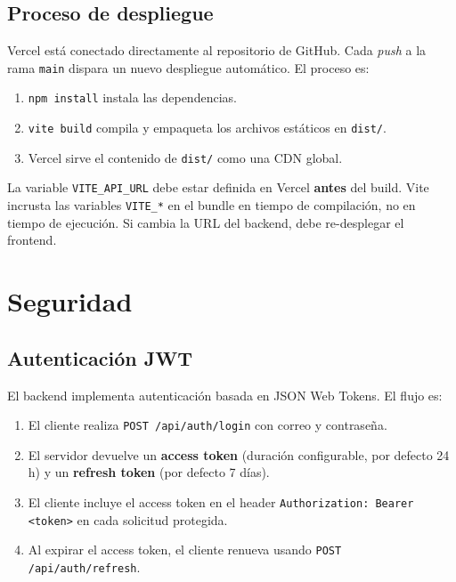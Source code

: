 \documentclass[11pt, a4paper]{article}
\begin{document}
\subsection{Proceso de despliegue}

Vercel está conectado directamente al repositorio de GitHub. Cada \textit{push} a la rama \texttt{main} dispara un nuevo despliegue automático. El proceso es:

\begin{enumerate}
  \item \texttt{npm install} instala las dependencias.
  \item \texttt{vite build} compila y empaqueta los archivos estáticos en \texttt{dist/}.
  \item Vercel sirve el contenido de \texttt{dist/} como una CDN global.
\end{enumerate}

\begin{notabox}
  La variable \texttt{VITE\_API\_URL} debe estar definida en Vercel \textbf{antes} del build. Vite incrusta las variables \texttt{VITE\_*} en el bundle en tiempo de compilación, no en tiempo de ejecución. Si cambia la URL del backend, debe re-desplegar el frontend.
\end{notabox}

\section{Seguridad}

\subsection{Autenticación JWT}

El backend implementa autenticación basada en JSON Web Tokens. El flujo es:

\begin{enumerate}
  \item El cliente realiza \texttt{POST /api/auth/login} con correo y contraseña.
  \item El servidor devuelve un \textbf{access token} (duración configurable, por defecto 24 h) y un \textbf{refresh token} (por defecto 7 días).
  \item El cliente incluye el access token en el header \texttt{Authorization: Bearer <token>} en cada solicitud protegida.
  \item Al expirar el access token, el cliente renueva usando \texttt{POST /api/auth/refresh}.
\end{enumerate}
\end{document}
